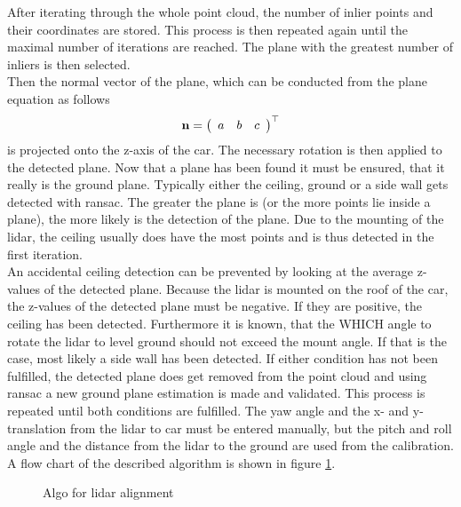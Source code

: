 After iterating through the whole point cloud, the number of inlier points and their coordinates are stored.
This process is then repeated again until the maximal number of iterations are reached.
The plane with the greatest number of inliers is then selected.\\
Then the normal vector of the plane, which can be conducted from the plane equation as follows
\begin{equation}
    \vb{n} = \left(\begin{array}{lll} a & b & c \end{array}\right)^{\top}
\end{equation}
is projected onto the z-axis of the car.
The necessary rotation is then applied to the detected plane.
Now that a plane has been found it must be ensured, that it really is the ground plane.
Typically either the ceiling, ground or a side wall gets detected with \gls{ransac}.
The greater the plane is (or the more points lie inside a plane), the more likely is the detection of the plane.
Due to the mounting of the lidar, the ceiling usually does have the most points and is thus detected in the first iteration.\\
An accidental ceiling detection can be prevented by looking at the average z-values of the detected plane.
Because the lidar is mounted on the roof of the car, the z-values of the detected plane must be negative.
If they are positive, the ceiling has been detected.
Furthermore it is known, that the WHICH angle to rotate the lidar to level ground should not exceed the mount angle.
If that is the case, most likely a side wall has been detected.
If either condition has not been fulfilled, the detected plane does get removed from the point cloud and using \gls{ransac} a new ground plane estimation is made and validated.
This process is repeated until both conditions are fulfilled.
The yaw angle and the x- and y-translation from the \gls{lidar} to car
must be entered manually, but the pitch and roll angle and the distance from the \gls{lidar} to the ground are used from the calibration.
A flow chart of the described algorithm is shown in figure \ref{fig:flowchart_lidar_calibration}.

\begin{figure}[htb]
    \centering
    
    \caption{Algo for \gls{lidar} alignment}
    \label{fig:flowchart_lidar_calibration}
\end{figure}

